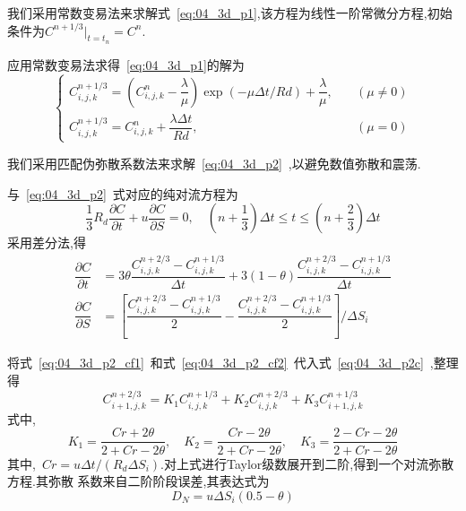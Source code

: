 \documentclass[xcolor=svgnames]{beamer} %
\begin{document}
\begin{frame}
我们采用常数变易法来求解式~\eqref{eq:04_3d_p1},该方程为线性一阶常微分方程,初始条件为$C^{n+1/3}|_{t=t_n}=C^n$.\par
应用常数变易法求得~\eqref{eq:04_3d_p1}的解为
\begin{equation}
\begin{cases}
C_{i,j,k}^{n+1/3}=(C_{i,j,k}^n-\dfrac{\lambda}{\mu})\exp(-\mu\Delta t/Rd)+\dfrac{\lambda}{\mu},& \quad (\mu\not=0) \\[0.8em]
C_{i,j,k}^{n+1/3}=C_{i,j,k}^n+\dfrac{\lambda\Delta t}{Rd},&\quad (\mu=0)
\end{cases}
\end{equation}\par
\end{frame}
\begin{frame}
我们采用匹配伪弥散系数法来求解~\eqref{eq:04_3d_p2}~,以避免数值弥散和震荡.\par
与~\eqref{eq:04_3d_p2}~式对应的纯对流方程为
\begin{equation}\label{eq:04_3d_p2c}
\dfrac{1}{3} R_d\dfrac{\partial C}{\partial t}+u\dfrac{\partial C}{\partial S}=0,\quad (n+\dfrac{1}{3})\Delta t\leq t\leq (n+\dfrac{2}{3})\Delta t
\end{equation}
采用差分法,得
\begin{align}
\dfrac{\partial C}{\partial t} &= 3\theta\dfrac{C_{i,j,k}^{n+2/3}-C_{i,j,k}^{n+1/3}}{\Delta t}+3(1-\theta)\dfrac{C_{i,j,k}^{n+2/3}-C_{i,j,k}^{n+1/3}}{\Delta t} \label{eq:04_3d_p2_cf1}\\[0.6em]
\dfrac{\partial C}{\partial S} &= \left[\dfrac{C_{i,j,k}^{n+2/3}-C_{i,j,k}^{n+1/3}}{2}-\dfrac{C_{i,j,k}^{n+2/3}-C_{i,j,k}^{n+1/3}}{2}\right] / \Delta S_i \label{eq:04_3d_p2_cf2}
\end{align}
\end{frame}
\begin{frame}
 将式~\eqref{eq:04_3d_p2_cf1}~和式~\eqref{eq:04_3d_p2_cf2}~代入式~\eqref{eq:04_3d_p2c}~,整理得
\begin{equation}\label{eq:04_3d_p2zl}
C_{i+1,j,k}^{n+2/3}=K_1C_{i,j,k}^{n+1/3}+K_2C_{i,j,k}^{n+2/3}+K_3C_{i+1,j,k}^{n+1/3}
\end{equation}
式中,
\begin{equation*}
K_1=\dfrac{Cr+2\theta}{2+Cr-2\theta},\quad K_2=\dfrac{Cr-2\theta}{2+Cr-2\theta},\quad K_3=\dfrac{2-Cr-2\theta}{2+Cr-2\theta}
\end{equation*}
其中,~$Cr=u\Delta t/(R_d\Delta S_i)$.对上式进行Taylor级数展开到二阶,得到一个对流弥散方程.其弥散
系数来自二阶阶段误差,其表达式为
\begin{equation*}
D_N=u\Delta S_i(0.5-\theta)
\end{equation*}
\end{frame}
\end{document}
